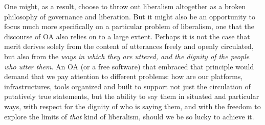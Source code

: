 \documentclass[11pt]{report}
\begin{document}
One might, as a result, choose to throw out liberalism altogether as a broken philosophy of governance and liberation.  But it might also be an opportunity to focus much more specifically on a particular problem of liberalism, one that the discourse of OA also relies on to a large extent.  Perhaps it is not the case that merit derives solely from the content of utterances freely and openly circulated, but also from the \emph{ways in which they are uttered, and the dignity of the people who utter them}.  An OA (or a free software) that embraced that principle would demand that we pay attention to different problems:  how are our platforms, infrastructures, tools organized and built to support not just the circulation of putatively true statements, but the ability to say them in situated and particular ways, with respect for the dignity of who is saying them, and with the freedom to explore the limits of \emph{that} kind of liberalism, should we be so lucky to achieve it. 

\theendnotes
 \printbibliography
\end{document}
